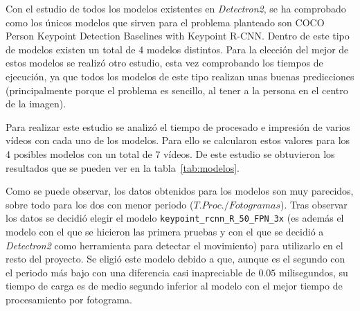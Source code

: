 {Con el estudio de todos los modelos existentes en \textit{Detectron2}, se ha comprobado como los únicos modelos que sirven para el problema planteado son COCO Person Keypoint Detection Baselines with Keypoint R-CNN. Dentro de este tipo de modelos existen un total de 4 modelos distintos. Para la elección del mejor de estos modelos se realizó otro estudio, esta vez comprobando los tiempos de ejecución, ya que todos los modelos de este tipo realizan unas buenas predicciones (principalmente porque el problema es sencillo, al tener a la persona en el centro de la imagen).

Para realizar este estudio se analizó el tiempo de procesado e impresión de varios vídeos con cada uno de los modelos. Para ello se calcularon estos valores para los 4 posibles modelos con un total de 7 vídeos. De este estudio se obtuvieron los resultados que se pueden ver en la tabla~\ref{tab:modelos}.

\begin{table}[h]
	\centering
\caption{Tabla con el estudio de los modelos de posición ordenado por periodo.}
\label{tab:modelos}
\end{table}

Como se puede observar, los datos obtenidos para los modelos son muy parecidos, sobre todo para los dos con menor periodo ($T. Proc./Fotogramas$). Tras observar los datos se decidió elegir el modelo \texttt{keypoint\_rcnn\_R\_50\_FPN\_3x} (es además el modelo con el que se hicieron las primera pruebas y con el que se decidió a \textit{Detectron2} como herramienta para detectar el movimiento) para utilizarlo en el resto del proyecto. Se eligió este modelo debido a que, aunque es el segundo con el periodo más bajo con una diferencia casi inapreciable de $0.05$ milisegundos, su tiempo de carga es de medio segundo inferior al modelo con el mejor tiempo de procesamiento por fotograma.

}

